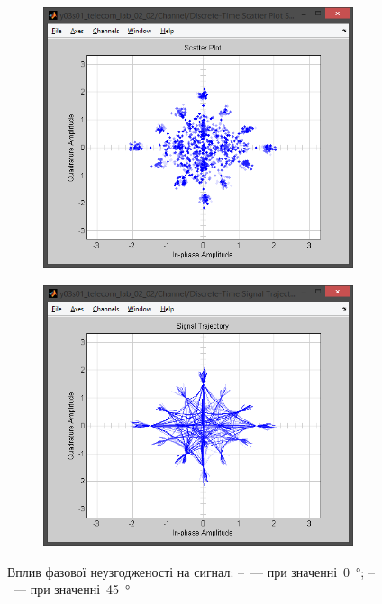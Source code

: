 \documentclass[
	a4paper,
	oneside,
	BCOR = 10mm,
	DIV = 12,
	12pt,
	headings = normal,
]{scrartcl}
\begin{document}
\begin{figure}[!htbp]
\begin{subfigure}{\textwidth / 3}
						\caption{}
						\label{subfig:phaseshift-eye-out}
					\end{subfigure}%
					\begin{subfigure}{\textwidth / 3}
						\centering
						\includegraphics[height = 7\baselineskip]{../01-solution/02-phaseshift-45-deg-channel-scatter-plot.png}
						\caption{}
						\label{subfig:phaseshift-signal-trajectory-out}
					\end{subfigure}%
					\begin{subfigure}{\textwidth / 3}
						\centering
						\includegraphics[height = 7\baselineskip]{../01-solution/02-phaseshift-45-deg-channel-signal-trajectory.png}
						\caption{}
						\label{subfig:phaseshift-scatter-plot-out}
					\end{subfigure}%
					\caption{Вплив фазової неузгодженості на сигнал: –~— при значенні~\SI{0}{\degree}; –~— при значенні~\SI{45}{\degree}}
					\label{fig:phaseshift-plots}
				\end{figure}
\end{document}
